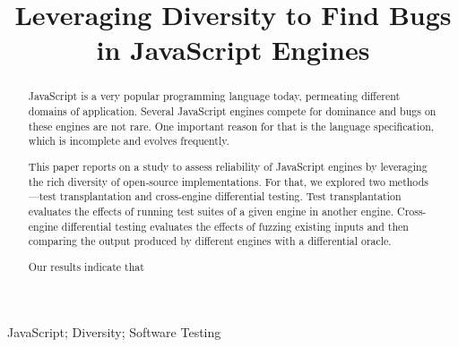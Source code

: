 \documentclass[10pt,conference,anonymous]{IEEEtran}
\begin{document}
\title{Leveraging Diversity to Find Bugs\\ in JavaScript Engines}


\maketitle

\thispagestyle{plain}
\pagestyle{plain}

\begin{abstract}
JavaScript is a very popular programming language today, permeating
different domains of application. Several JavaScript engines compete
for dominance and bugs on these engines are not rare. One important
reason for that is the language specification, which is incomplete and
evolves frequently.

This paper reports on a study to assess reliability
of JavaScript engines by leveraging the rich diversity of open-source
implementations. For that, we explored two methods---test
transplantation and cross-engine differential testing. Test
transplantation evaluates the effects of running test suites of a given
engine in another engine. Cross-engine differential testing evaluates
the effects of fuzzing existing inputs and then comparing the output
produced by different engines with a differential oracle.

Our results indicate that 
\end{abstract}

\begin{IEEEkeywords}
JavaScript; Diversity; Software Testing
\end{IEEEkeywords}
\end{document}
